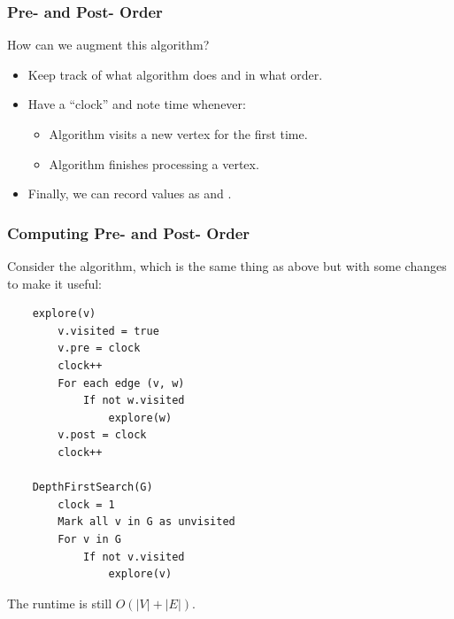 \documentclass[letterpaper]{article}
\begin{document}
\subsubsection{Pre- and Post- Order}
How can we augment this algorithm?
\begin{itemize}
    \item Keep track of what algorithm does and in what order. 
    \item Have a ``clock'' and note time whenever: 
    \begin{itemize}
        \item Algorithm visits a new vertex for the first time. 
        \item Algorithm finishes processing a vertex.
    \end{itemize}
    \item Finally, we can record values as  and .
\end{itemize}

\subsubsection{Computing Pre- and Post- Order}
Consider the algorithm, which is the same thing as above but with some changes to make it useful: 
\begin{verbatim}
    explore(v)
        v.visited = true 
        v.pre = clock 
        clock++
        For each edge (v, w)
            If not w.visited
                explore(w)
        v.post = clock 
        clock++

    DepthFirstSearch(G)
        clock = 1
        Mark all v in G as unvisited
        For v in G
            If not v.visited
                explore(v)
\end{verbatim}
The runtime is still $O(|V| + |E|)$. 
\end{document}
